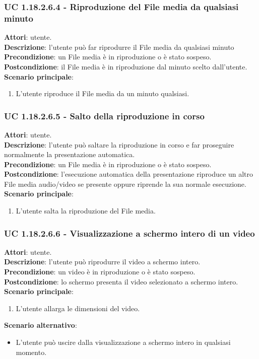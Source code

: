 	\subsubsection{UC 1.18.2.6.4 - Riproduzione del File media da qualsiasi minuto}{
		\label{uc1.18.2.6.4}
		\textbf{Attori}: utente. \\
		\textbf{Descrizione}: l'utente può far riprodurre il File media da qualsiasi minuto
		\textbf{Precondizione}: un File media è in riproduzione o è stato sospeso.	\\
		\textbf{Postcondizione}: il File media è in riproduzione dal minuto scelto dall'utente.\\
		\textbf{Scenario principale}:
		\begin{enumerate}
			\item L'utente riproduce il File media da un minuto qualsiasi. 
		\end{enumerate}				
	}
	\subsubsection{UC 1.18.2.6.5 - Salto della riproduzione in corso}{
		\label{uc1.18.2.6.5}
		\textbf{Attori}: utente. \\
		\textbf{Descrizione}: l'utente può saltare la riproduzione in corso e far proseguire normalmente la presentazione automatica. \\
		\textbf{Precondizione}: un File media è in riproduzione o è stato sospeso.	\\
		\textbf{Postcondizione}: l'esecuzione automatica della presentazione riproduce un altro File media audio/video se presente oppure riprende la sua normale esecuzione.\\
		\textbf{Scenario principale}:
		\begin{enumerate}
			\item L'utente salta la riproduzione del File media.
		\end{enumerate}						
	}
	\subsubsection{UC 1.18.2.6.6 - Visualizzazione a schermo intero di un video}{
		\label{uc1.18.2.6.6}
		\textbf{Attori}: utente. \\
		\textbf{Descrizione}: l'utente può riprodurre il video a schermo intero. \\
		\textbf{Precondizione}: un video è in riproduzione o è stato sospeso.	\\
		\textbf{Postcondizione}: lo schermo presenta il video selezionato a schermo intero.\\
		\textbf{Scenario principale}:
		\begin{enumerate}
			\item L'utente allarga le dimensioni del video.
		\end{enumerate}	
		\textbf{Scenario alternativo}:
		\begin{itemize}
			\item L'utente può uscire dalla visualizzazione a schermo intero in qualsiasi momento.
		\end{itemize}
	}
